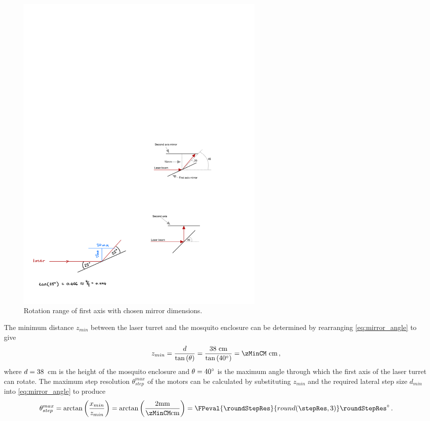 \begin{figure}[h]
    \centering
    \includegraphics[width=0.6\textwidth]{figures/hardware_design/rotation_range_of_first_axis.pdf}
    \caption{Rotation range of first axis with chosen mirror dimensions.}
    \label{fig:turret_motion_range}
\end{figure}

The minimum distance $z_{min}$ between the laser turret and the mosquito enclosure can be determined by rearranging \autoref{eq:mirror_angle} to give
\begin{equation}
    z_{min} = \frac{d}{\tan\left(\theta\right)} = \frac{\enclosureHeightCM \text{ cm}}{\tan\left(40\degree\right)} = \zMinCM \text{ cm}\,,
\end{equation}
where $d = 38$~cm is the height of the mosquito enclosure and $\theta = 40^{\circ}$ is the maximum angle through which the first axis of the laser turret can rotate. The maximum step resolution $\theta_{step}^{max}$ of the motors can be calculated by substituting $z_{min}$ and the required lateral step size $d_{min}$ into \autoref{eq:mirror_angle} to produce
\begin{equation}
    \theta_{step}^{max} = \arctan\left({\frac{x_{min}}{z_{min}}}\right) = \arctan\left({\frac{\requiredLatStepSizeMM \text{mm}}{\zMinCM \text{cm}}}\right) = \FPeval{\roundStepRes}{round(\stepRes, 3)}\roundStepRes\degree\,.
    \label{eq:max_step_resolution}
\end{equation}


